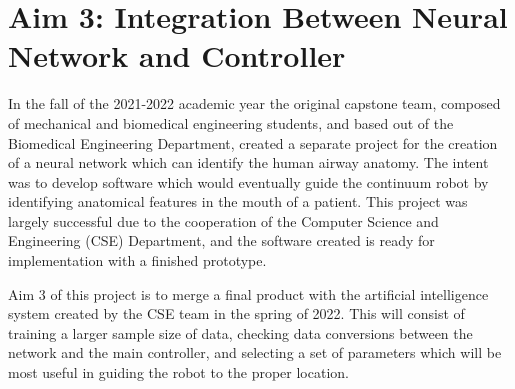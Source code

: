 	\section{Aim 3: Integration Between Neural Network and Controller}
	\label{subsect:aim3}
	
	In the fall of the 2021-2022 academic year the original capstone team, composed of mechanical and biomedical engineering students, and based out of the Biomedical Engineering Department, created a separate project for the creation of a neural network which can identify the human airway anatomy. The intent was to develop software which would eventually guide the continuum robot by identifying anatomical features in the mouth of a patient. This project was largely successful due to the cooperation of the Computer Science and Engineering (CSE) Department, and the software created is ready for implementation with a finished prototype.
	
	Aim 3 of this project is to merge a final product with the artificial intelligence system created by the CSE team in the spring of 2022. This will consist of training a larger sample size of data, checking data conversions between the network and the main controller, and selecting a set of parameters which will be most useful in guiding the robot to the proper location.
